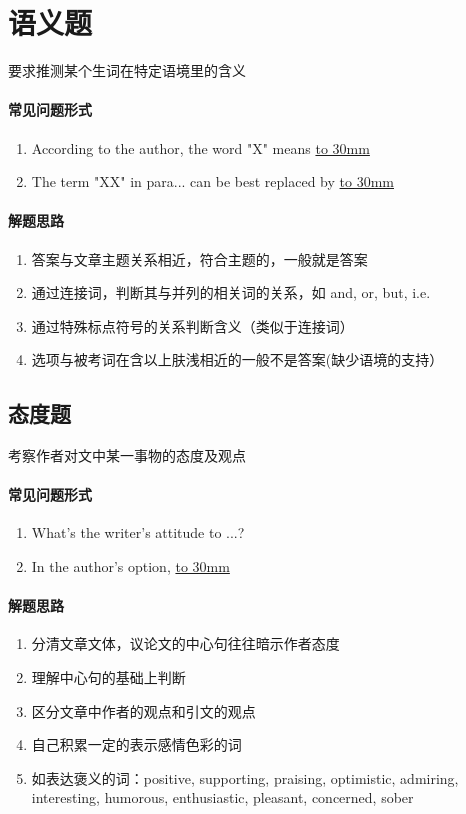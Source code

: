 \documentclass[a4paper]{ctexart}
\begin{document}
\section{语义题}
要求推测某个生词在特定语境里的含义
\paragraph{常见问题形式}
\begin{enumerate}
    \item According to the author, the word "X" means \underline{\hbox to 30mm{}} 
    \item The term "XX" in para... can be best replaced by \underline{\hbox to 30mm{}} 
\end{enumerate}

\paragraph{解题思路}
\begin{enumerate}
    \item 答案与文章主题关系相近，符合主题的，一般就是答案
    \item 通过连接词，判断其与并列的相关词的关系，如 and, or, but, i.e.
    \item 通过特殊标点符号的关系判断含义（类似于连接词）
    \item 选项与被考词在含以上肤浅相近的一般不是答案(缺少语境的支持）
\end{enumerate}

\subsection{态度题}
考察作者对文中某一事物的态度及观点
\paragraph{常见问题形式}
\begin{enumerate}
    \item What's the writer's attitude to ...?
    \item In the author's option, \underline{\hbox to 30mm{}} 
\end{enumerate}
\paragraph{解题思路}
\begin{enumerate}
    \item 分清文章文体，议论文的中心句往往暗示作者态度
    \item 理解中心句的基础上判断
    \item 区分文章中作者的观点和引文的观点
    \item 自己积累一定的表示感情色彩的词
    \item 如表达褒义的词：positive, supporting, praising, optimistic, admiring, interesting, humorous, enthusiastic, pleasant, concerned, sober
\end{enumerate}
\end{document}
